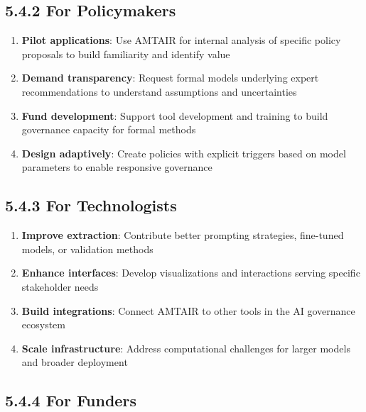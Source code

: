 \documentclass[
  11pt,
  letterpaper,
]{book}
\begin{document}
\subsection*{5.4.2 For
Policymakers}\label{sec-policymaker-recommendations}

\begin{enumerate}
\def\labelenumi{\arabic{enumi}.}
\item
  \textbf{Pilot applications}: Use AMTAIR for internal analysis of
  specific policy proposals to build familiarity and identify value
\item
  \textbf{Demand transparency}: Request formal models underlying expert
  recommendations to understand assumptions and uncertainties
\item
  \textbf{Fund development}: Support tool development and training to
  build governance capacity for formal methods
\item
  \textbf{Design adaptively}: Create policies with explicit triggers
  based on model parameters to enable responsive governance
\end{enumerate}

\subsection*{5.4.3 For
Technologists}\label{sec-technologist-recommendations}

\begin{enumerate}
\def\labelenumi{\arabic{enumi}.}
\item
  \textbf{Improve extraction}: Contribute better prompting strategies,
  fine-tuned models, or validation methods
\item
  \textbf{Enhance interfaces}: Develop visualizations and interactions
  serving specific stakeholder needs
\item
  \textbf{Build integrations}: Connect AMTAIR to other tools in the AI
  governance ecosystem
\item
  \textbf{Scale infrastructure}: Address computational challenges for
  larger models and broader deployment
\end{enumerate}

\subsection*{5.4.4 For Funders}\label{sec-funder-recommendations}
\end{document}
